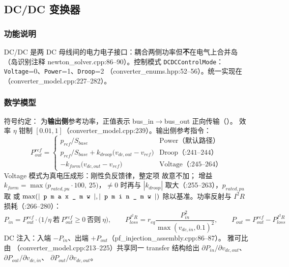 \subsection{DC/DC 变换器}\label{sec:hybrid-dcdc}


\subsubsection*{功能说明}
DC/DC 是两 DC 母线间的电力电子接口：耦合两侧功率但\textbf{不}在电气上合并岛
（岛识别注释 newton\_solver.cpp:86--90）。控制模式 \texttt{DCDCControlMode}：
\texttt{Voltage}=0、\texttt{Power}=1、\texttt{Droop}=2
（converter\_enums.hpp:52--56）。统一实现在
（converter\_model.cpp:227--282）。

\subsubsection*{数学模型}
符号约定： 为\textbf{输出侧}参考功率，正值表示 bus\_in$\to$bus\_out
正向传输（）。
效率 $\eta$ 钳制 $[0.01,1]$（converter\_model.cpp:239）。输出侧参考指令：
\[
P_{out}^{ref}=\begin{cases}
p_{ref}/S_{base} & \text{Power（默认路径）}\\
p_{ref}/S_{base}+k_{droop}\big(v_{dc,out}-v_{ref}\big) & \text{Droop（:241--244）}\\
-k_{form}\big(v_{dc,out}-v_{ref}\big) & \text{Voltage（:245--264）}
\end{cases}
\]
Voltage 模式为真电压成形：刚性负反馈律，整定项  故意不加；
增益 $k_{form}=\max\big(p_{rated,pu}\cdot 100,\ 25\big)$，$\neq0$ 时再与
$|k_{droop}|$ 取大（:255--263），$p_{rated,pu}$ 取  或
$\max(|\fld{pmax\_mw}|,|\fld{pmin\_mw}|)$ 除以基准。功率反射与 $I^2R$ 损耗（:266--280）：
\[
P_{in}=P_{out}^{ref}\cdot\big(1/\eta\ \text{若}\ P_{out}^{ref}\ge 0\ \text{否则}\ \eta\big),\qquad
P_{loss}^{I^2R}=r_{eq}\frac{P_{in}^{2}}{\max(v_{dc,in},0.1)^{2}},\qquad
P_{out}=P_{out}^{ref}-P_{loss}^{I^2R}
\]
DC 注入：入端 $-P_{in}$、出端 $+P_{out}$（pf\_injection\_assembly.cpp:86--87）。
雅可比由 （converter\_model.cpp:213--225）共享同一
transfer 结构给出 $\partial P_{in}/\partial v_{dc,out}$、$\partial P_{out}/\partial v_{dc,in}$、
$\partial P_{out}/\partial v_{dc,out}$。

